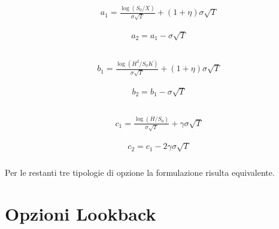 \documentclass[12pt,a4paper]{report}
\begin{document}
\begin{multicols}{2} %
\begin{align*}
\begin{aligned}
&a_1 = \frac{\log(S_0/X)}{\sigma\sqrt{T}} + (1 + \eta)\sigma\sqrt{T}
\end{aligned}
\end{align*}
\columnbreak %
\begin{align*}
\begin{aligned}
\\
&a_2 = a_1 - \sigma\sqrt{T} \\
\end{aligned}
\end{align*}
\end{multicols}

\begin{multicols}{2} %
\begin{align*}
\begin{aligned}
&b_1 = \frac{\log\left(H^2/S_0K\right)}{\sigma\sqrt{T}} + (1 + \eta)\sigma\sqrt{T}
\end{aligned}
\end{align*}
\columnbreak %
\begin{align*}
\begin{aligned}
\\
&b_2 = b_1 - \sigma\sqrt{T} \\
\end{aligned}
\end{align*}
\end{multicols}

\begin{multicols}{2} %
\begin{align*}
\begin{aligned}
&c_1 = \frac{\log\left(H/S_0\right)}{\sigma\sqrt{T}} + \gamma\sigma\sqrt{T}
\end{aligned}
\end{align*}
\columnbreak %
\begin{align*}
\begin{aligned}
\\
&c_2 = c_1 - 2\gamma\sigma\sqrt{T} \\
\end{aligned}
\end{align*}
\end{multicols}


Per le restanti tre tipologie di opzione la formulazione risulta equivalente.

\section{Opzioni Lookback}
\end{document}
